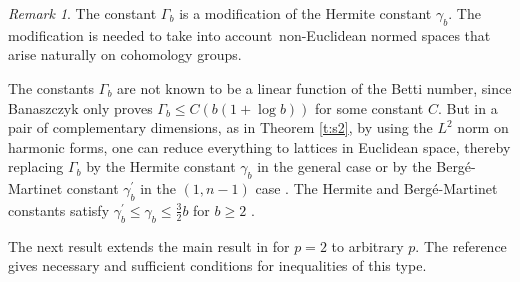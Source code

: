\documentclass[12pt]{amsart}
\theoremstyle{definition}
\theoremstyle{remark}
\newtheorem{remark}[theorem]{Remark}
\numberwithin{equation}{section}
\begin{document}
\begin{remark} 
The constant $\Gamma_b$ is a modification of the Hermite constant $\gamma_b$. The modification is needed to take into account non-Euclidean normed spaces that arise naturally on cohomology groups.

The constants $\Gamma_b$ are not known to be a linear function of the Betti number, since Banaszczyk \cite[Corollary 2]{WB} only proves  $\Gamma_b \leq C( b (1+\log b))$ for some constant $C$.  But in a pair of complementary dimensions, as in Theorem \ref{t:s2}, by using the $L^2$ norm on harmonic forms, one can reduce everything to lattices in Euclidean space, thereby replacing  $\Gamma_b$ by the Hermite constant $\gamma_b$  in the general case \cite[Proposition 6]{JH} or  by the  Berg\'e-Martinet constant  $\gamma^\prime_b$ in the $(1,n-1)$ case \cite{BK}. The Hermite and Berg\'e-Martinet constants satisfy $\gamma_b^\prime \leq \gamma_b \leq \frac 32 b$ for $b\geq 2$ \cite[(5.3.4)]{MK}.
\end{remark}




The next result extends the main result in \cite{GHK} for $p=2$ to arbitrary $p$. The reference \cite{MB} gives necessary and sufficient conditions for inequalities of this type.
\end{document}
